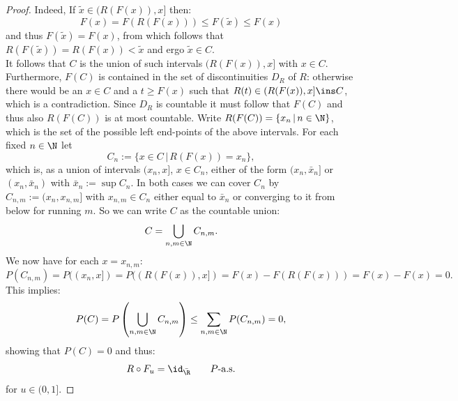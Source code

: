 \begin{Lem}
\begin{proof}
Indeed, If $\tilde{x} \in (R(F(x)),x]$ then: 
\[F(x)=F(R(F(x))) \le F(\tilde{x}) \le F(x)\]
and thus $F(\tilde{x})=F(x)$, from which follows that $R(F(\tilde{x}))=R(F(x))<\tilde{x}$ and ergo $\tilde{x} \in C$.\\
It follows that $C$ is the union of such intervals $(R(F(x)),x]$ with $x \in C$. Furthermore, $F(C)$ is contained in the set of discontinuities $D_R$ of $R$: otherwise there would be an $x \in C$ and a $t \ge F(x)$ such that $R(t) \in (R(F(x)),x] \ins C$, which is a contradiction.
Since $D_R$ is countable it must follow that $F(C)$ and thus also $R(F(C))$ is at most countable. Write $R(F(C))=\{x_n\,|\,n \in\N\}$, which is the set of the possible left end-points of the above intervals. 
For each fixed $n \in \N$ let 
\[ C_n:= \{ x \in C\,|\, R(F(x)) = x_n\}, \]
which is, as a union of intervals $(x_n,x]$, $x \in C_n$, either of the form $(x_n,\bar x_n]$ or $(x_n,\bar x_n)$ with $\bar x_n:= \sup C_n$. In both cases we can cover $C_n$ by 
$C_{n,m}:=(x_n,x_{n,m}]$ with $x_{n,m}\in C_n$ either equal to $\bar x_n$ or converging to it from below for running $m$.
So we can write $C$ as the countable union:
\[ C = \bigcup_{n,m \in \N} C_{n,m}.\]
We now have for each $x=x_{n,m}$:
\[P(C_{n,m}) = P((x_n,x]) = P((R(F(x)),x])=F(x) - F(R(F(x)))  = F(x)-F(x)=0.\]
This implies: 
\[P(C) = P\left(\bigcup_{n,m \in \N} C_{n,m} \right) \le \sum_{n,m \in \N} P(C_{n,m})=0,\]
showing that $P(C) =0$ and thus:
 \[ R \circ F_u  = \id_{\bar\R}\qquad P\text{-a.s.} \]
 for $u \in (0,1]$.
\end{proof}
\end{Lem}


